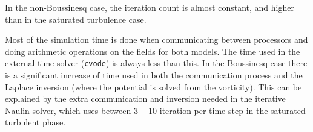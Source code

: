 In the non-Boussinesq case, the iteration count is almost constant, and higher than in the saturated turbulence case.

Most of the simulation time is done when communicating between processors and doing arithmetic operations on the fields for both models.
The time used in the external time solver (\texttt{cvode}) is always less than this.
In the Boussinesq case there is a significant increase of time used in both the communication process and the Laplace inversion (where the potential is solved from the vorticity).
This can be explained by the extra communication and inversion needed in the iterative Naulin solver, which uses between $3-10$ iteration per time step in the saturated turbulent phase.
